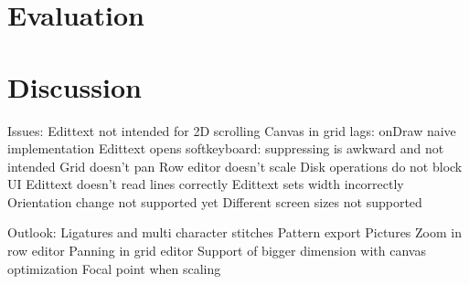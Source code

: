 \documentclass[a4paper,11pt]{kth-mag}
\begin{document}
\chapter{Evaluation}


\chapter{Discussion}

Issues:
Edittext not intended for 2D scrolling
Canvas in grid lags: onDraw naive implementation
Edittext opens softkeyboard: suppressing is awkward and not intended
Grid doesn’t pan
Row editor doesn’t scale
Disk operations do not block UI
Edittext doesn’t read lines correctly
Edittext sets width incorrectly
Orientation change not supported yet
Different screen sizes not supported

Outlook:
Ligatures and multi character stitches
Pattern export
Pictures
Zoom in row editor
Panning in grid editor
Support of bigger dimension with canvas optimization
Focal point when scaling




{}

\end{document}
